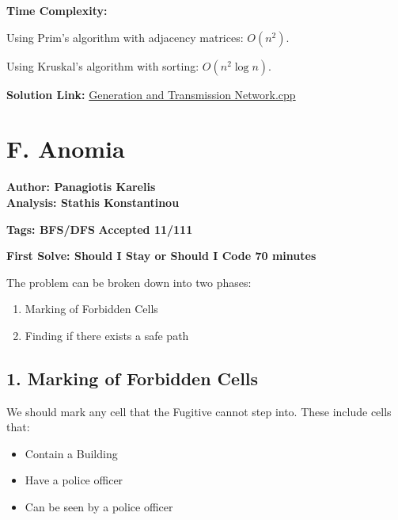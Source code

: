 \documentclass{article}
\begin{document}
\vspace{1em}

\noindent \noindent \textbf{Time Complexity:}

\noindent Using Prim’s algorithm with adjacency matrices: $O(n^2)$. 

\noindent Using Kruskal’s algorithm with sorting: $O(n^2 \log n)$.

\vspace{1em}
\noindent \textbf{Solution Link:} 
\href{https://github.com/StathisKons/GRCPC-2024-Editorial-Implementations/blob/main/E.%20Generation%20and%20Transmission%20Network.cpp}{Generation and Transmission Network.cpp}

\newpage
\vspace{5em}

\section*{F. Anomia}

    \textbf{Author: Panagiotis Karelis}\\
    \textbf{Analysis: Stathis Konstantinou}
    
    \vspace{2em}
    \noindent \textbf{Tags: BFS/DFS} 
    \hfill \textbf{Accepted 11/111}
    
    \hfill \textbf{First Solve: Should I Stay or Should I Code 70 minutes}
    
    \vspace{2em}
    
    \noindent The problem can be broken down into two phases:
    
    \begin{enumerate}
        \item{Marking of Forbidden Cells}
        \item{Finding if there exists a safe path}
    \end{enumerate}
    
    \subsection*{1. Marking of Forbidden Cells}

        \noindent We should mark any cell that the Fugitive cannot step into. These include cells that:
        \begin{itemize}
            \item{Contain a Building}
            \item{Have a police officer}
            \item{Can be seen by a police officer}
        \end{itemize}
\end{document}
